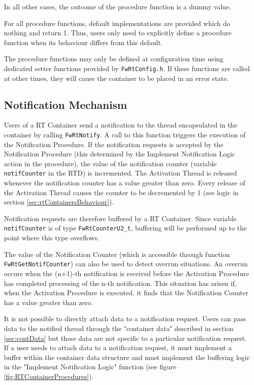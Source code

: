 \documentclass[a4paper,10pt]{article}
\begin{document}
In all other cases, the outcome of the procedure function is a dummy value.

For all procedure functions, default implementations are provided which do nothing and return 1. Thus, users only need to explicitly define a procedure function when its behaviour differs from this default.

The procedure functions may only be defined at configuration time using dedicated setter functions provided by \texttt{FwRtConfig.h}. If these functions are called at other times, they will cause the container to be placed in an error state.

\subsection{Notification Mechanism}\label{sec:notifMechanism}
Users of a RT Container send a notification to the thread encapsulated in the container by calling \texttt{FwRtNotify}. A call to this function triggers the execution of the Notification Procedure. If the notification requests is accepted by the Notification Procedure (this determined by the Implement Notification Logic action in the procedure), the value of the notification counter (variable \texttt{notifCounter} in the RTD) is incremented. The Activation Thread is released whenever the notification counter has a value greater than zero. Every release of the Activation Thread causes the counter to be decremented by 1 (see logic in section \ref{sec:rtContainersBehaviour}). 

Notification requests are therefore buffered by a RT Container. Since variable \texttt{notifCounter} is of type \texttt{FwRtCounterU2\_t}, buffering will be performed up to the point where this type overflows. 

The value of the Notification Counter (which is accessible through function \texttt{FwRtGetNotifCounter}) can also be used to detect overrun situations. An overrun occurs when the (n+1)-th notification is received before the Activation Procedure has completed processing of the n-th notification. This situation has arisen if, when the Activation Procedure is executed, it finds that the Notification Counter has a value greater than zero. 

It is not possible to directly attach data to a notification request. Users can pass data to the notified thread through the "container data" described in section \ref{sec:contData} but these data are not specific to a particular notification request. If a user needs to attach data to a notification request, it must implement a buffer within the container data structure and must implement the buffering logic in the "Implement Notification Logic" function (see figure \ref{fig:RTContainerProcedures}).
\end{document}
